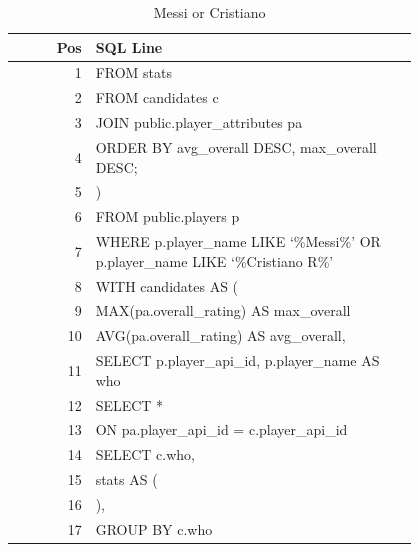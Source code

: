 \documentclass{article}
\begin{document}
\begin{table}[t]
  \centering
  \caption{Messi or Cristiano}
  \label{tab:messi-cristiano}
  \begin{tabular}{ r p{0.8\linewidth}}
    \toprule
    \textbf{Pos}
    & \textbf{SQL Line} \\
    \midrule
    1
    & FROM stats \\
    2
    &   FROM candidates c \\
    3
    &   JOIN public.player\_attributes pa \\
    4
    & ORDER BY avg\_overall DESC, max\_overall DESC; \\
    5
    & ) \\
    6
    &   FROM public.players p \\
    7
    &   WHERE p.player\_name LIKE `\%Messi\%' OR p.player\_name LIKE `\%Cristiano R\%' \\
    8
    & WITH candidates AS ( \\
    9
    &          MAX(pa.overall\_rating) AS max\_overall \\
    10
    &          AVG(pa.overall\_rating) AS avg\_overall, \\
    11
    &   SELECT p.player\_api\_id, p.player\_name AS who \\
    12
    & SELECT *  \\
    13
    &   ON pa.player\_api\_id = c.player\_api\_id \\
    14
    &   SELECT c.who, \\
    15
    & stats AS ( \\
    16
    & ), \\
    17
    &   GROUP BY c.who \\
    \bottomrule
  \end{tabular}
\end{table}
\end{document}
